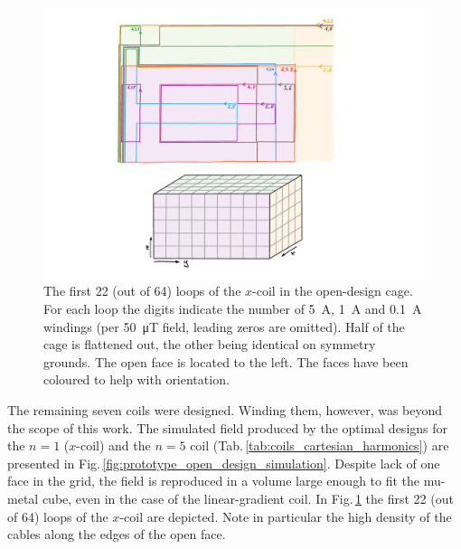 \begin{figure}
  \centering
  \includegraphics[width=\linewidth]{gfx/prototype/open_design_Xcoil_coils.pdf}
  \caption{The first 22 (out of 64) loops of the $x$-coil in the open-design cage. For each loop the digits indicate the number of \SI{5}{\ampere}, \SI{1}{\ampere} and \SI{0.1}{\ampere} windings (per \SI{50}{\micro\tesla} field, leading zeros are omitted).
  Half of the cage is flattened out, the other being identical on symmetry grounds.
  The open face is located to the left. The faces have been coloured to help with orientation.}\label{fig:prototype_open_design_Xcoil_coils}
\end{figure}

The remaining seven coils were designed.
Winding them, however, was beyond the scope of this work.
The simulated field produced by the optimal designs for the $n = 1$ ($x$-coil) and the $n = 5$ coil (Tab.\,\ref{tab:coils_cartesian_harmonics}) are presented in Fig.\,\ref{fig:prototype_open_design_simulation}.
Despite lack of one face in the grid, the field is reproduced in a volume large enough to fit the mu-metal cube, even in the case of the linear-gradient coil.
In Fig.\,\ref{fig:prototype_open_design_Xcoil_coils} the first 22 (out of 64) loops of the $x$-coil are depicted.
Note in particular the high density of the cables along the edges of the open face.

